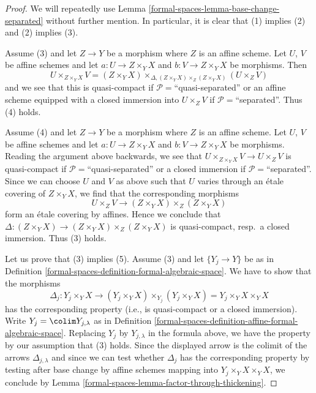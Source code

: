 \begin{proof}
We will repeatedly use
Lemma \ref{formal-spaces-lemma-base-change-separated}
without further mention. In particular, it is clear that
(1) implies (2) and (2) implies (3).

\medskip\noindent
Assume (3) and let $Z \to Y$ be a morphism where $Z$ is an affine scheme.
Let $U$, $V$ be affine schemes and let $a : U \to Z \times_Y X$
and $b : V \to Z \times_Y X$ be morphisms. Then
$$
U \times_{Z \times_Y X} V =
(Z \times_Y X) \times_{\Delta, (Z \times_Y X) \times_Z (Z \times_Y X)}
(U \times_Z V)
$$
and we see that this is quasi-compact if $\mathcal{P} =$``quasi-separated''
or an affine scheme equipped with a closed immersion into
$U \times_Z V$ if $\mathcal{P} =$``separated''. Thus (4) holds.

\medskip\noindent
Assume (4) and let $Z \to Y$ be a morphism where $Z$ is an affine scheme.
Let $U$, $V$ be affine schemes and let $a : U \to Z \times_Y X$
and $b : V \to Z \times_Y X$ be morphisms. Reading the argument above
backwards, we see that $U \times_{Z \times_Y X} V \to U \times_Z V$
is quasi-compact if $\mathcal{P} =$``quasi-separated'' or a closed
immersion if $\mathcal{P} =$``separated''. Since we can choose $U$ and
$V$ as above such that $U$ varies through an
\'etale covering of $Z \times_Y X$, we find
that the corresponding morphisms
$$
U \times_Z V \to (Z \times_Y X) \times_Z (Z \times_Y X)
$$
form an \'etale covering by affines. Hence we conclude that
$\Delta : (Z \times_Y X) \to (Z \times_Y X) \times_Z (Z \times_Y X)$
is quasi-compact, resp.\ a closed immersion. Thus (3) holds.

\medskip\noindent
Let us prove that (3) implies (5). Assume (3) and let
$\{Y_j \to Y\}$ be as in
Definition \ref{formal-spaces-definition-formal-algebraic-space}.
We have to show that the morphisms
$$
\Delta_j :
Y_j \times_Y X
\longrightarrow
(Y_j \times_Y X) \times_{Y_j} (Y_j \times_Y X) =
Y_j \times_Y X \times_Y X
$$
has the corresponding property (i.e., is quasi-compact or a closed immersion).
Write $Y_j = \colim Y_{j, \lambda}$ as in
Definition \ref{formal-spaces-definition-affine-formal-algebraic-space}.
Replacing $Y_j$ by $Y_{j, \lambda}$ in the formula above, we have the
property by our assumption that (3) holds. Since the displayed arrow
is the colimit of the arrows $\Delta_{j, \lambda}$ and since we
can test whether $\Delta_j$ has the corresponding property by
testing after base change by affine schemes mapping into
$Y_j \times_Y X \times_Y X$, we conclude by
Lemma \ref{formal-spaces-lemma-factor-through-thickening}.


\end{proof}
